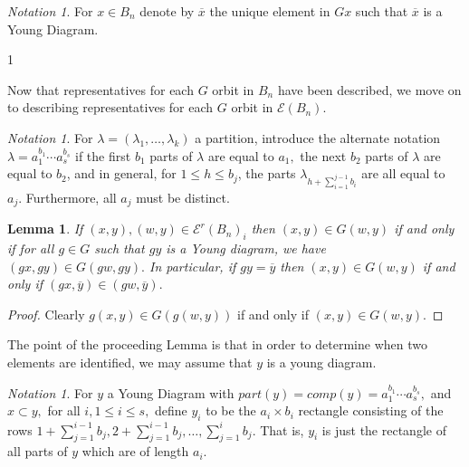 \documentclass[10 pt]{amsart}
\theoremstyle{plain}
\newtheorem{lem}[thm]{Lemma}
\theoremstyle{definition}
\theoremstyle{remark}
\newtheorem{note}[thm]{Notation}
\numberwithin{equation}{section}
\begin{document}
\begin{note}
For $x \in B_n$ denote by $\overline{x}$ the unique element in $Gx$ such that $\overline{x}$ is a Young Diagram.
\end{note}1

Now that representatives for each $G$ orbit in $B_n$ have been described, we move on to describing representatives for each $G$ orbit in $\mathcal E(B_n).$

\begin{note}
For $\lambda = (\lambda_1,\ldots, \lambda_k)$ a partition, introduce the alternate notation $\lambda = a_1^{b_1} \cdots a_s^{b_s}$ if the first $b_1$ parts of $\lambda$ are equal to $a_1,$ the next $b_2$ parts of $\lambda$ are equal to $b_2$, and in general, for $1 \leq h\leq b_j$, the parts $ \lambda_{h+\sum_{i=1}^{j-1} b_i}$ are all equal to $a_j.$ Furthermore, all $a_j$ must be distinct.
\end{note}

\begin{lem}
\label{lem:young_diag_reduction}
If $(x, y), (w, y) \in\mathcal E^r(B_n)_i$ then $(x, y) \in G(w, y)$ if and only if for all $g \in G$ such that $gy$ is a Young diagram, we have $(gx, gy) \in G(gw, gy).$ In particular, if $gy = \overline y$ then $(x, y) \in G(w, y)$ if and only if $(gx, \overline y) \in (gw, \overline y).$
\end{lem}
\begin{proof}
Clearly $g(x, y) \in G(g(w, y))$ if and only if $(x, y) \in G(w, y).$
\end{proof}

The point of the proceeding Lemma is that in order to determine when two elements are identified, we may assume that $y$ is a young diagram.

\begin{note}
For $y$ a Young Diagram with $part(y) = comp(y) = a_1^{b_1}\cdots a_s^{b_s},$ and $x \subset y,$ for all $i,1 \leq i \leq s,$ define $y_i$ to be the $a_i \times b_i$ rectangle consisting of the rows $1+\sum_{j = 1}^{i-1} b_j,2+\sum_{j = 1}^{i-1} b_j,\ldots, \sum_{j = 1}^{i} b_j.$ That is, $y_i$ is just the rectangle of all parts of $y$ which are of length $a_i.$
\end{note}
\end{document}
